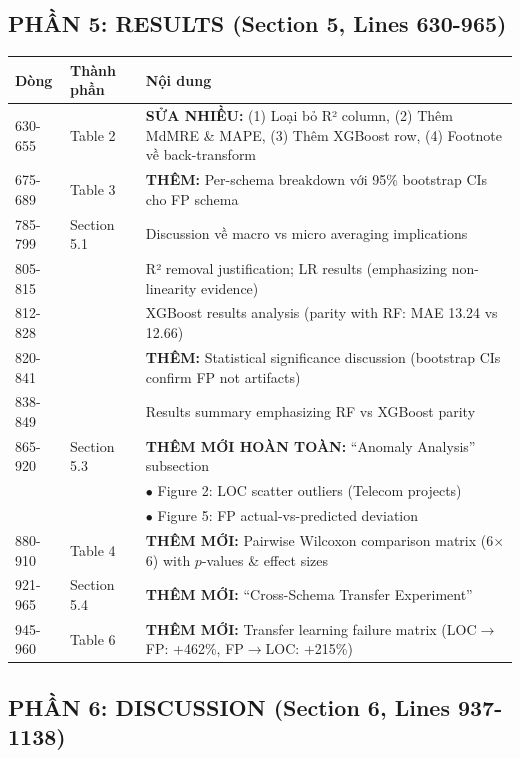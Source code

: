 \documentclass[11pt,a4paper]{article}
\begin{document}
\subsection*{PHẦN 5: RESULTS (Section 5, Lines 630-965)}

\begin{longtable}{p{}p{}p{}}
\toprule
\textbf{Dòng} & \textbf{Thành phần} & \textbf{Nội dung} \\
\midrule
630-655 & Table 2 & \textbf{SỬA NHIỀU:} (1) Loại bỏ R² column, (2) Thêm MdMRE \& MAPE, (3) Thêm XGBoost row, (4) Footnote về back-transform \\
675-689 & Table 3 & \textbf{THÊM:} Per-schema breakdown với 95\% bootstrap CIs cho FP schema \\
785-799 & Section 5.1 & Discussion về macro vs micro averaging implications \\
805-815 & & R² removal justification; LR results (emphasizing non-linearity evidence) \\
812-828 & & XGBoost results analysis (parity with RF: MAE 13.24 vs 12.66) \\
820-841 & & \textbf{THÊM:} Statistical significance discussion (bootstrap CIs confirm FP not artifacts) \\
838-849 & & Results summary emphasizing RF vs XGBoost parity \\
865-920 & Section 5.3 & \textbf{THÊM MỚI HOÀN TOÀN:} ``Anomaly Analysis'' subsection \\
& & $\bullet$ Figure 2: LOC scatter outliers (Telecom projects) \\
& & $\bullet$ Figure 5: FP actual-vs-predicted deviation \\
880-910 & Table 4 & \textbf{THÊM MỚI:} Pairwise Wilcoxon comparison matrix (6$\times$6) with $p$-values \& effect sizes \\
921-965 & Section 5.4 & \textbf{THÊM MỚI:} ``Cross-Schema Transfer Experiment'' \\
945-960 & Table 6 & \textbf{THÊM MỚI:} Transfer learning failure matrix (LOC$\rightarrow$FP: +462\%, FP$\rightarrow$LOC: +215\%) \\
\bottomrule
\end{longtable}

\subsection*{PHẦN 6: DISCUSSION (Section 6, Lines 937-1138)}
\end{document}
